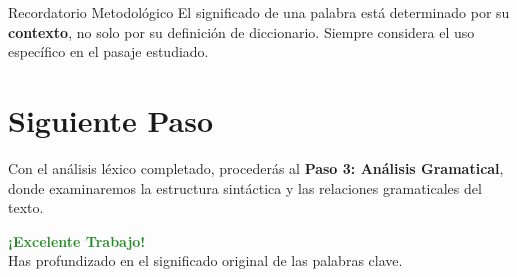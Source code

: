 \documentclass[11pt,a4paper]{article}
\begin{document}
\begin{infobox}{Recordatorio Metodológico}
El significado de una palabra está determinado por su \textbf{contexto}, no solo por su definición de diccionario. Siempre considera el uso específico en el pasaje estudiado.
\end{infobox}

\section{Siguiente Paso}

Con el análisis léxico completado, procederás al \textbf{Paso 3: Análisis Gramatical}, donde examinaremos la estructura sintáctica y las relaciones gramaticales del texto.

\vspace{1cm}

\begin{center}
\begin{tcolorbox}[colback=mintgreen!20, colframe=mintgreen, width=0.7\textwidth]
\centering
\textcolor{forestgreen}{\textbf{¡Excelente Trabajo!}}\\
\textcolor{papergray}{Has profundizado en el significado original de las palabras clave.}
\end{tcolorbox}
\end{center}
\end{document}
